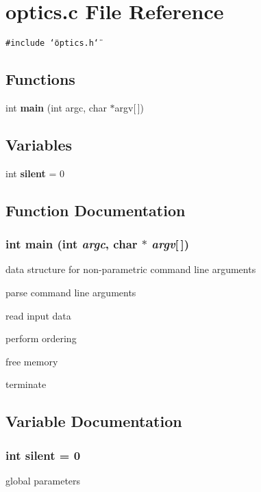 \section{optics.c File Reference}
\label{optics_8c}
{\tt \#include \char`\"{}optics.h\char`\"{}}\par
\subsection*{Functions}
\begin{CompactItemize}
\item 
int {\bf main} (int argc, char $\ast$argv[$\,$])
\end{CompactItemize}
\subsection*{Variables}
\begin{CompactItemize}
\item 
int {\bf silent} = 0
\end{CompactItemize}


\subsection{Function Documentation}
\subsubsection{\setlength{\rightskip}{0pt plus 5cm}int main (int {\em argc}, char $\ast$ {\em argv}[$\,$])}\label{optics_8c_0ddf1224851353fc92bfbff6f499fa97}




data structure for non-parametric command line arguments

parse command line arguments

read input data

perform ordering

free memory

terminate 

\subsection{Variable Documentation}
\subsubsection{\setlength{\rightskip}{0pt plus 5cm}int {\bf silent} = 0}\label{optics_8c_582e2ef9670c974c00e00ad10af0e629}


global parameters 